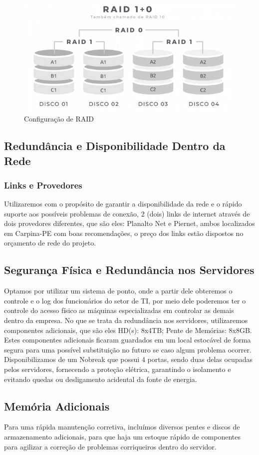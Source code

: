 \documentclass[12pt]{article}
\begin{document}
\begin{figure}[ht]
\centering
\includegraphics[height=0.3\textwidth]{RAID10.png}
\caption{Configuração de RAID}
\label{fig:adds-pastas}
\end{figure}

\subsection{Redundância e Disponibilidade Dentro da Rede}

\subsubsection{Links e Provedores}
Utilizaremos com o propósito de garantir a disponibilidade da rede e o rápido suporte aos possíveis problemas de conexão, 2 (dois) links de internet através de dois provedores diferentes, que são eles: Planalto Net e Piernet, ambos localizados em Carpina-PE com boas recomendações, o preço dos links estão dispostos no orçamento de rede do projeto.

\subsection{Segurança Física e Redundância nos Servidores}
Optamos por utilizar um sistema de ponto, onde a partir dele obteremos o controle e o log dos funcionários do setor de TI, por meio dele poderemos ter o controle do acesso físico as máquinas especializadas em controlar as demais dentro da empresa. No que se trata da redundância nos servidores, utilizaremos componentes adicionais, que são eles HD(s): 8x4TB; Pente de Memórias: 8x8GB. Estes componentes adicionais ficaram guardados em um local estocável de forma segura para uma possível substituição no futuro se caso algum problema ocorrer. Disponibilizamos de um Nobreak que possui 4 portas, sendo duas delas ocupadas pelos servidores, fornecendo a proteção elétrica, garantindo o isolamento e evitando quedas ou desligamento acidental da fonte de energia.

\subsection{Memória Adicionais}
Para uma rápida manutenção corretiva, incluímos diversos pentes e discos de armazenamento adicionais, para que haja um estoque rápido de componentes para agilizar a correção de problemas corriqueiros dentro do servidor.
\end{document}
